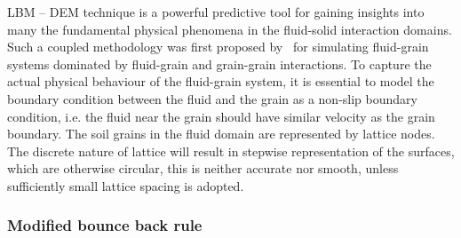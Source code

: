 LBM -- DEM technique is a powerful predictive tool for gaining insights into 
many the fundamental physical phenomena in the fluid-solid interaction domains. 
Such a coupled methodology was first proposed by~\citep{Cook2004} for 
simulating fluid-grain systems dominated by fluid-grain and grain-grain 
interactions. To capture the actual physical behaviour of the fluid-grain 
system, it is essential to model the boundary condition between the fluid and 
the grain as a non-slip boundary condition, i.e. the fluid near the grain 
should have similar velocity as the grain boundary. The soil grains in 
the fluid domain are represented by lattice nodes. The discrete nature of 
lattice will result in stepwise representation of the surfaces, which are 
otherwise circular, this is  neither accurate nor smooth, unless sufficiently 
small lattice spacing is adopted. 


\subsubsection*{Modified bounce back rule}

